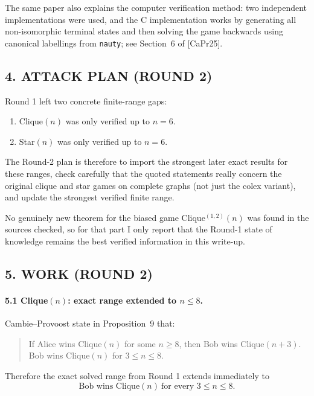 The same paper also explains the computer verification method: two independent implementations were used, and the C implementation works by generating all non-isomorphic terminal states and then solving the game backwards using canonical labellings from \texttt{nauty}; see Section~6 of [CaPr25].

\subsection*{4. ATTACK PLAN (ROUND 2)}

Round 1 left two concrete finite-range gaps:

\begin{enumerate}
\item Clique$(n)$ was only verified up to $n=6$.
\item Star$(n)$ was only verified up to $n=6$.
\end{enumerate}

The Round-2 plan is therefore to import the strongest later exact results for these ranges, check carefully that the quoted statements really concern the original clique and star games on complete graphs (not just the colex variant), and update the strongest verified finite range.

No genuinely new theorem for the biased game Clique$^{(1,2)}(n)$ was found in the sources checked, so for that part I only report that the Round-1 state of knowledge remains the best verified information in this write-up.

\subsection*{5. WORK (ROUND 2)}

\paragraph{5.1 Clique$(n)$: exact range extended to $n \leq 8$.}

Cambie--Provoost state in Proposition~9 that:

\begin{quote}
If Alice wins Clique$(n)$ for some $n \geq 8$, then Bob wins Clique$(n+3)$. Bob wins Clique$(n)$ for $3 \leq n \leq 8$.
\end{quote}

Therefore the exact solved range from Round 1 extends immediately to
\[
\mbox{Bob wins Clique}(n)\ \mbox{for every } 3 \leq n \leq 8.
\]

